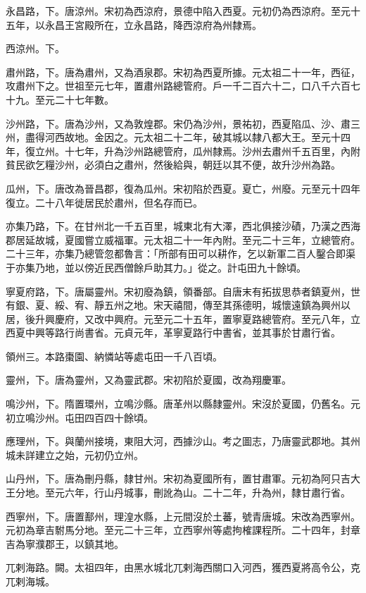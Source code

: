 \begin{pinyinscope}
 永昌路，下。唐涼州。宋初為西涼府，景德中陷入西夏。元初仍為西涼府。至元十五年，以永昌王宮殿所在，立永昌路，降西涼府為州隸焉。



 西涼州。下。



 肅州路，下。唐為肅州，又為酒泉郡。宋初為西夏所據。元太祖二十一年，西征，攻肅州下之。世祖至元七年，置肅州路總管府。戶一千二百六十二，口八千六百七十九。至元二十七年數。



 沙州路，下。唐為沙州，又為敦煌郡。宋仍為沙州，景祐初，西夏陷瓜、沙、肅三州，盡得河西故地。金因之。元太祖二十二年，破其城以隸八都大王。至元十四年，復立州。十七年，升為沙州路總管府，瓜州隸焉。沙州去肅州千五百里，內附貧民欲乞糧沙州，必須白之肅州，然後給與，朝廷以其不便，故升沙州為路。



 瓜州，下。唐改為晉昌郡，復為瓜州。宋初陷於西夏。夏亡，州廢。元至元十四年復立。二十八年徙居民於肅州，但名存而已。



 亦集乃路，下。在甘州北一千五百里，城東北有大澤，西北俱接沙磧，乃漢之西海郡居延故城，夏國嘗立威福軍。元太祖二十一年內附。至元二十三年，立總管府。二十三年，亦集乃總管忽都魯言：「所部有田可以耕作，乞以新軍二百人鑿合即渠于亦集乃地，並以傍近民西僧餘戶助其力。」從之。計屯田九十餘頃。



 寧夏府路，下。唐屬靈州。宋初廢為鎮，領番部。自唐末有拓拔思恭者鎮夏州，世有銀、夏、綏、宥、靜五州之地。宋天禧間，傳至其孫德明，城懷遠鎮為興州以居，後升興慶府，又改中興府。元至元二十五年，置寧夏路總管府。至元八年，立西夏中興等路行尚書省。元貞元年，革寧夏路行中書省，並其事於甘肅行省。



 領州三。本路棗園、納憐站等處屯田一千八百頃。



 靈州，下。唐為靈州，又為靈武郡。宋初陷於夏國，改為翔慶軍。



 鳴沙州，下。隋置環州，立鳴沙縣。唐革州以縣隸靈州。宋沒於夏國，仍舊名。元初立鳴沙州。屯田四百四十餘頃。



 應理州，下。與蘭州接境，東阻大河，西據沙山。考之圖志，乃唐靈武郡地。其州城未詳建立之始，元初仍立州。



 山丹州，下。唐為刪丹縣，隸甘州。宋初為夏國所有，置甘肅軍。元初為阿只吉大王分地。至元六年，行山丹城事，刪訛為山。二十二年，升為州，隸甘肅行省。



 西寧州，下。唐置鄯州，理湟水縣，上元間沒於土蕃，號青唐城。宋改為西寧州。元初為章吉駙馬分地。至元二十三年，立西寧州等處拘榷課程所。二十四年，封章吉為寧濮郡王，以鎮其地。



 兀剌海路。闕。太祖四年，由黑水城北兀剌海西關口入河西，獲西夏將高令公，克兀剌海城。



\end{pinyinscope}